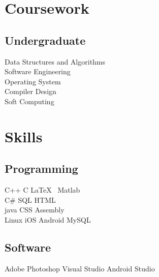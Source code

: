 \documentclass[a4paper]{manish-resume} %
\begin{document}
\begin{minipage}[t]{0.33\textwidth}
\sectionspace %


\section{Coursework}

\subsection{Undergraduate}

Data Structures and Algorithms \\
Software Engineering \\
Operating System \\
Compiler Design \\
Soft Computing\\

\sectionspace %



\section{Skills}

\subsection{Programming}

C++ \textbullet{} C \textbullet{} \LaTeX\  \textbullet{} Matlab \\
C\# \textbullet{} SQL \textbullet{} HTML \\ 
java \textbullet{}  CSS \textbullet{} Assembly \\
Linux \textbullet{} iOS \textbullet{} Android \textbullet{} MySQL
\sectionspace
\subsection{Software}
Adobe Photoshop \textbullet{} Visual Studio \textbullet{} Android Studio

\sectionspace %


\end{minipage} %
\end{document}
